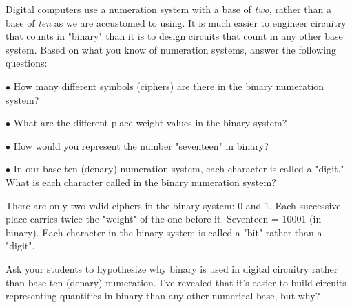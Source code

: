 

Digital computers use a numeration system with a base of {\it two}, rather than a base of {\it ten} as we are accustomed to using.  It is much easier to engineer circuitry that counts in "binary" than it is to design circuits that count in any other base system.  Based on what you know of numeration systems, answer the following questions:

\medskip
\item{$\bullet$} How many different symbols (ciphers) are there in the binary numeration system?
\item{$\bullet$} What are the different place-weight values in the binary system?
\item{$\bullet$} How would you represent the number "seventeen" in binary?
\item{$\bullet$} In our base-ten (denary) numeration system, each character is called a "digit."  What is each character called in the binary numeration system?
\medskip







There are only two valid ciphers in the binary system: 0 and 1.  Each successive place carries twice the "weight" of the one before it.  Seventeen = 10001 (in binary).  Each character in the binary system is called a "bit" rather than a "digit".







Ask your students to hypothesize why binary is used in digital circuitry rather than base-ten (denary) numeration.  I've revealed that it's easier to build circuits representing quantities in binary than any other numerical base, but why?




